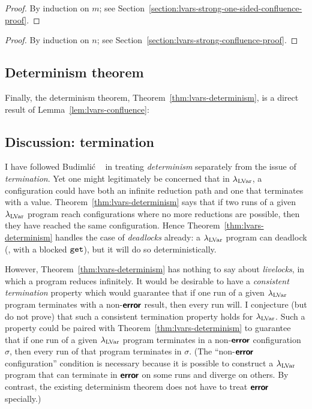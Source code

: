 \LVarsLemStrongOneSidedConfluence
\begin{proof}
  By induction on $m$; see
  Section~\ref{section:lvars-strong-one-sided-confluence-proof}.
\end{proof}

\LVarsLemStrongConfluence
\begin{proof}
  By induction on $n$; see
  Section~\ref{section:lvars-strong-confluence-proof}.
\end{proof}

\LVarsLemConfluence

\subsection{Determinism theorem}

Finally, the determinism theorem, Theorem~\ref{thm:lvars-determinism},
is a direct result of Lemma~\ref{lem:lvars-confluence}:

\LVarsThmDeterminism

\subsection{Discussion: termination}

I have followed Budimli\'c \etal~\cite{CnC} in treating
\emph{determinism} separately from the issue of \emph{termination}.
Yet one might legitimately be concerned that in $\lambda_{\textrm{LVar}}$, a
configuration could have both an infinite reduction path and one that
terminates with a value.  Theorem~\ref{thm:lvars-determinism} says
that if two runs of a given $\lambda_{\textrm{LVar}}$ program reach configurations
where no more reductions are possible, then they have reached the same
configuration.  Hence Theorem~\ref{thm:lvars-determinism} handles the
case of \emph{deadlocks} already: a $\lambda_{\textrm{LVar}}$ program can deadlock
(\eg, with a blocked $\mbox{\texttt{get}}$), but it will do so deterministically.

However, Theorem~\ref{thm:lvars-determinism} has nothing to say about
\emph{livelocks}, in which a program reduces infinitely.  It would be
desirable to have a \emph{consistent termination} property which would
guarantee that if one run of a given $\lambda_{\textrm{LVar}}$ program terminates
with a non-$\textbf{\textsf{error}}$ result, then every run will.  I conjecture (but do
not prove) that such a consistent termination property holds for
$\lambda_{\textrm{LVar}}$.  Such a property could be paired with
Theorem~\ref{thm:lvars-determinism} to guarantee that if one run of a
given $\lambda_{\textrm{LVar}}$ program terminates in a non-$\textbf{\textsf{error}}$ configuration
$\sigma$, then every run of that program terminates in $\sigma$.  (The
``non-$\textbf{\textsf{error}}$ configuration'' condition is necessary because it is
possible to construct a $\lambda_{\textrm{LVar}}$ program that can terminate in
$\textbf{\textsf{error}}$ on some runs and diverge on others.  By contrast, the
existing determinism theorem does not have to treat $\textbf{\textsf{error}}$
specially.)
